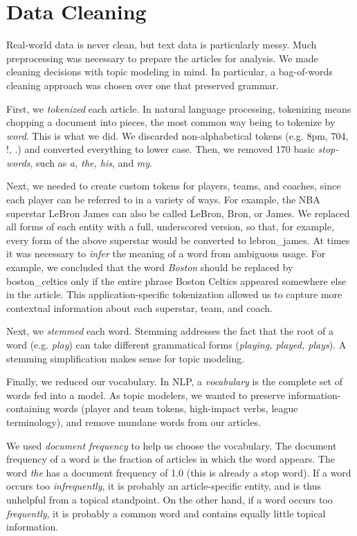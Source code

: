 \documentclass[11pt]{article}
\begin{document}
\section{Data Cleaning}
Real-world data is never clean, but text data is particularly messy. Much preprocessing was necessary to prepare the articles for analysis. We made cleaning decisions with topic modeling in mind.  In particular, a bag-of-words cleaning approach was chosen over one that preserved grammar.

First, we \textit{tokenized} each article. In natural language processing, tokenizing means chopping a document into pieces, the most common way being to tokenize by \textit{word}. This is what we did.  We discarded non-alphabetical tokens (e.g. 8pm, 704, !, .) and converted everything to lower case.  Then, we removed 170 basic \textit{stop-words}, such as \textit{a, the, his}, and \textit{my}. 

Next, we needed to create custom tokens for players, teams, and coaches, since each player can be referred to in a variety of ways. For example, the NBA superstar LeBron James can also be called LeBron, Bron, or James.  We replaced all forms of each entity with a full, underscored version, so that, for example, every form of the above superstar would be converted to lebron\_james.  At times it was necessary to \textit{infer} the meaning of a word from ambiguous usage. For example, we concluded that the word \textit{Boston} should be replaced by boston\_celtics only if the entire phrase Boston Celtics appeared somewhere else in the article.  This application-specific tokenization allowed us to capture more contextual information about each superstar, team, and coach.

Next, we \textit{stemmed} each word. Stemming addresses the fact that the root of a word (e.g. \textit{play}) can take different grammatical forms (\textit{playing, played, plays}). A stemming simplification makes sense for topic modeling.

Finally, we reduced our vocabulary. In NLP, a \textit{vocabulary} is the complete set of words fed into a model.  As topic modelers, we wanted to preserve information-containing words (player and team tokens, high-impact verbs, league terminology), and remove mundane words from our articles.

We used \textit{document frequency} to help us choose the vocabulary. The document frequency of a word is the fraction of articles in which the word appears. The word \textit{the} has a document frequency of 1.0 (this is already a stop word). If a word occurs too \textit{infrequently}, it is probably an article-specific entity, and is thus unhelpful from a topical standpoint. On the other hand, if a word occurs too \textit{frequently}, it is probably a common word and  contains equally little topical information.
\end{document}
